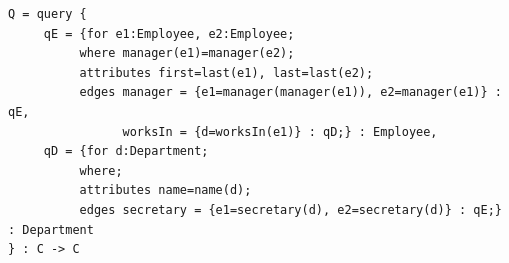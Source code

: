 \documentclass[12pt]{article}
\begin{document}
\begin{verbatim}
Q = query {
	 qE = {for e1:Employee, e2:Employee; 
	 	  where manager(e1)=manager(e2); 
	 	  attributes first=last(e1), last=last(e2); 
	 	  edges manager = {e1=manager(manager(e1)), e2=manager(e1)} : qE, 
	 	        worksIn = {d=worksIn(e1)} : qD;} : Employee,
	 qD = {for d:Department; 
	 	  where; 
	 	  attributes name=name(d); 
	 	  edges secretary = {e1=secretary(d), e2=secretary(d)} : qE;} : Department
} : C -> C
\end{verbatim}
\end{document}
